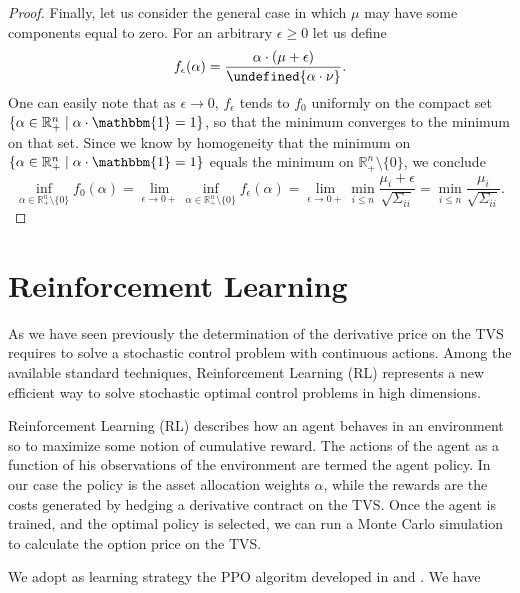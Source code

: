 \documentclass[11pt]{article}
\let\norm\undefined %
\DeclarePairedDelimiter\norm{\lVert}{\rVert}
\begin{document}
\begin{proof}
	Finally, let us consider the general case in which $\mu$ may have some components equal to zero. For an arbitrary $\epsilon \geq 0$ let us define
	\[
	f_{\epsilon}(\alpha) = \frac{\alpha \cdot (\mu+\epsilon)}{\norm{\alpha \cdot \nu}}.
	\]
	One can easily note that as $\epsilon \to 0$, $f_{\epsilon}$ tends to $f_{0}$ uniformly on the compact set $\{\alpha \in \mathbb{R}^n_+ \mid \alpha \cdot \mathbbm{1} = 1\}$, so that the minimum converges to the minimum on that set. Since we know by homogeneity that the minimum on $\{\alpha \in \mathbb{R}^n_+ \mid \alpha \cdot \mathbbm{1} = 1\}$ equals the minimum on $\mathbb{R}^n_+ \setminus \{0\}$, we conclude
	\[
	\inf_{\alpha \in \mathbb{R}_{+}^n \setminus \{0\}} f_0(\alpha) = 
	\lim_{\epsilon \to 0+} \inf_{\alpha \in \mathbb{R}_{+}^n \setminus \{0\}} f_{\epsilon}(\alpha) = 
	\lim_{\epsilon \to 0+} \min_{i\leq n} \frac{\mu_i+\epsilon}{\sqrt{\Sigma_{ii}}} =
	\min_{i\leq n} \frac{\mu_i}{\sqrt{\Sigma_{ii}}}.
	\]
\end{proof}

\section{Reinforcement Learning}\label{sec:RL}
As we have seen previously the determination of the derivative price on the TVS requires to  solve a stochastic control problem with continuous actions. Among the available standard techniques, Reinforcement Learning (RL) represents a new efficient way to solve stochastic optimal control problems in high dimensions.

 Reinforcement Learning (RL) describes how an agent behaves in an environment so to maximize some notion of cumulative reward. The actions of the agent as a function of his observations of the environment are termed the agent policy.  In our case the policy is the asset allocation weights $\alpha$, while the rewards are the costs generated by hedging a derivative contract on the TVS. Once the agent is trained, and the optimal policy is selected, we can run a Monte Carlo simulation to calculate the option price on the TVS. 
 
 We adopt as learning strategy the PPO algoritm developed in \cite{ppo} and \cite{gae}. We have 

\cleardoublepage
\printbibliography
\end{document}
